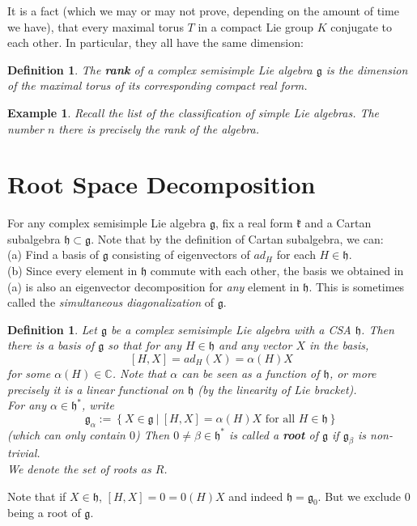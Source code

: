 \documentclass[11pt]{book}
\newtheorem{example}[theorem]{Example}
\newtheorem{definition}[theorem]{Definition}
\newcommand{\bb}[1]{\mathbb{#1}}
\newcommand{\mf}[1]{\mathfrak{#1}}
\begin{document}
It is a fact (which we may or may not prove, depending on the amount of time we have), that every maximal torus $T$ in a compact Lie group $K$ conjugate to each other. In particular, they all have the same dimension:
\begin{definition}
The \textbf{rank} of a complex semisimple Lie algebra $\mf{g}$ is the dimension of the maximal torus of its corresponding compact real form.
\end{definition}
\begin{example}
Recall the list of the classification of simple Lie algebras. The number $n$ there is precisely the rank of the algebra.
\end{example}

\section{Root Space Decomposition}
For any complex semisimple Lie algebra $\mf{g}$, fix a real form $\mf{k}$ and a Cartan subalgebra $\mf{h} \subset \mf{g}$. Note that by the definition of Cartan subalgebra, we can:\\
(a) Find a basis of $\mf{g}$ consisting of eigenvectors of $ad_H$ for each $H \in \mf{h}$.\\
(b) Since every element in $\mf{h}$ commute with each other, the basis we obtained in (a) is also an eigenvector decomposition for \textit{any} element in $\mf{h}$. This is sometimes called the \textit{simultaneous diagonalization} of $\mf{g}$.\\
\begin{definition}
Let $\mf{g}$ be a complex semisimple Lie algebra with a CSA $\mf{h}$. Then there is a basis of $\mf{g}$ so that for any $H \in \mf{h}$ and any vector $X$ in the basis,
$$[H,X] = ad_H(X) = \alpha(H)X$$
for some $\alpha(H) \in \bb{C}$. Note that $\alpha$ can be seen as a function of $\mf{h}$, or more precisely it is a linear functional on $\mf{h}$ (by the linearity of Lie bracket).\\
For any $\alpha \in \mf{h}^*$, write
$$\mf{g}_{\alpha} := \left\{ X \in \mf{g}\ \Big|\ [H,X] = \alpha(H)X \text{ for all }H \in \mf{h} \right\}$$
(which can only contain $0$) Then $0 \neq \beta \in \mf{h}^*$ is called a \textbf{root} of $\mf{g}$ if $\mf{g}_{\beta}$ is non-trivial.\\
We denote the set of roots as $R$.
\end{definition}
Note that if $X \in \mf{h}$, $[H,X] = 0 = 0(H)X$ and indeed $\mf{h} = \mf{g}_0$. But we exclude $0$ being a root of $\mf{g}$.
\end{document}
